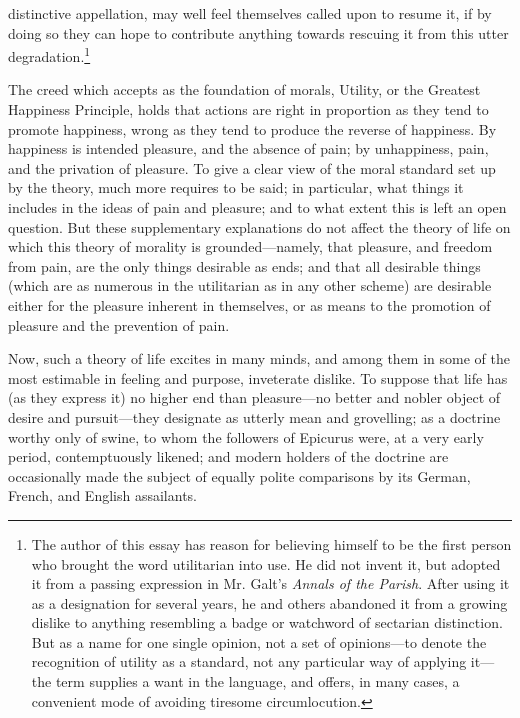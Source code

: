 distinctive appellation, may well feel themselves called upon to
resume it, if by doing so they can hope to contribute anything towards
rescuing it from this utter degradation.\footnote{The author of this
essay has reason for believing himself to be the first person who
brought the word utilitarian into use. He did not invent it, but
adopted it from a passing expression in Mr. Galt's \textit{Annals of
the Parish}. After using it as a designation for several years, he and
others abandoned it from a growing dislike to anything resembling a
badge or watchword of sectarian distinction. But as a name for one
single opinion, not a set of o\-pin\-ions---to denote the recognition
of utility as a standard, not any particular way of applying it---the
term supplies a want in the language, and offers, in many cases, a
convenient mode of avoiding tiresome circumlocution.}

The creed which accepts as the foundation of morals, Utility, or the
Greatest Happiness Principle, holds that actions are right in
proportion as they tend to promote happiness, wrong as they tend to
produce the  reverse of happiness. By happiness is intended
pleasure, and the absence of pain; by unhappiness, pain, and the
privation of pleasure. To give a clear view of the moral standard set
up by the theory, much more requires to be said; in particular, what
things it includes in the ideas of pain and pleasure; and to what
extent this is left an open question. But these supplementary
explanations do not affect the theory of life on which this theory of
morality is ground\-ed---name\-ly, that pleasure, and freedom from
pain, are the only things desirable as ends; and that all desirable
things (which are as numerous in the utilitarian as in any other
scheme) are desirable either for the pleasure inherent in themselves,
or as means to the promotion of pleasure and the prevention of pain.

Now, such a theory of life excites in many minds, and among them in
some of the most estimable in feeling and purpose, inveterate dislike.
To suppose that life has (as they express it) no higher end than
pleas\-ure---no better and nobler object of desire and
pur\-suit---they designate as utterly mean and grovelling; as a
doctrine worthy only of swine, to whom the followers of Epicurus were,
at a very early period, contemptuously likened; and modern holders of
the doctrine are occasionally made the subject of equally polite
comparisons by its German, French, and English assailants.

